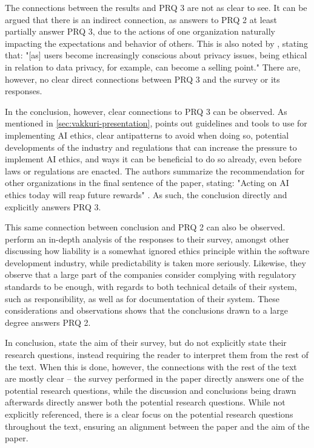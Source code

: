 The connections between the results and PRQ 3 are not as clear to see. It can be argued that there is an indirect connection, as answers to PRQ 2 at least partially answer PRQ 3, due to the actions of one organization naturally impacting the expectations and behavior of others. This is also noted by \textcite[p.55]{Vakkuri_2020}, stating that: "[as] users become increasingly conscious about privacy issues, being ethical in relation to data privacy, for example, can become a selling point." There are, however, no clear direct connections between PRQ 3 and the survey or its responses.

In the conclusion, however, clear connections to PRQ 3 can be observed. As mentioned in \autoref{sec:vakkuri-presentation}, \textcite{Vakkuri_2020} points out guidelines and tools to use for implementing AI ethics, clear antipatterns to avoid when doing so, potential developments of the industry and regulations that can increase the pressure to implement AI ethics, and ways it can be beneficial to do so already, even before laws or regulations are enacted. The authors summarize the recommendation for other organizations in the final sentence of the paper, stating: "Acting on AI ethics today will reap future rewards" \parencite[p.56]{Vakkuri_2020}. As such, the conclusion directly and explicitly answers PRQ 3.

This same connection between conclusion and PRQ 2 can also be observed. \textcite{Vakkuri_2020} perform an in-depth analysis of the responses to their survey, amongst other discussing how liability is a somewhat ignored ethics principle within the software development industry, while predictability is taken more seriously. Likewise, they observe that a large part of the companies consider complying with regulatory standards to be enough, with regards to both technical details of their system, such as responsibility, as well as for documentation of their system. These considerations and observations shows that the conclusions drawn to a large degree answers PRQ 2.

In conclusion, \textcite{Vakkuri_2020} state the aim of their survey, but do not explicitly state their research questions, instead requiring the reader to interpret them from the rest of the text. When this is done, however, the connections with the rest of the text are mostly clear -- the survey performed in the paper directly answers one of the potential research questions, while the discussion and conclusions being drawn afterwards directly answer both the potential research questions. While not explicitly referenced, there is a clear focus on the potential research questions throughout the text, ensuring an alignment between the paper and the aim of the paper.